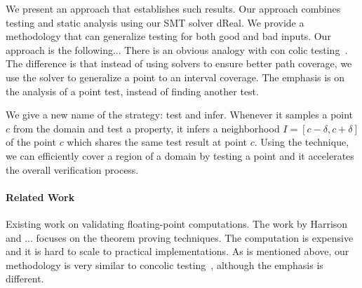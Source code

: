We present an approach that establishes such results. Our approach combines testing and static analysis using our SMT solver dReal. We provide a methodology that can generalize testing for both good and bad inputs. Our approach is the following... There is an obvious analogy with con colic testing~\cite{}. The difference is that instead of using solvers to ensure better path coverage, we use the solver to generalize a point to an interval coverage. The emphasis is on the analysis of a point test, instead of finding another test. 

We give a new name of the strategy: test and infer. 
Whenever it samples a point $c$ from the domain and test a property,
it infers a neighborhood $I = [c - \delta, c + \delta]$ of the point $c$
which shares the same test result at point $c$. Using the technique,
we can efficiently cover a region of a domain by testing a point and
it accelerates the overall verification process.


\paragraph{Related Work} Existing work on validating floating-point computations. The work by Harrison and ... focuses on the theorem proving techniques. The computation is expensive and it is hard to scale to practical implementations. As is mentioned above, our methodology is very similar to concolic testing~\cite{}, although the emphasis is different. 




